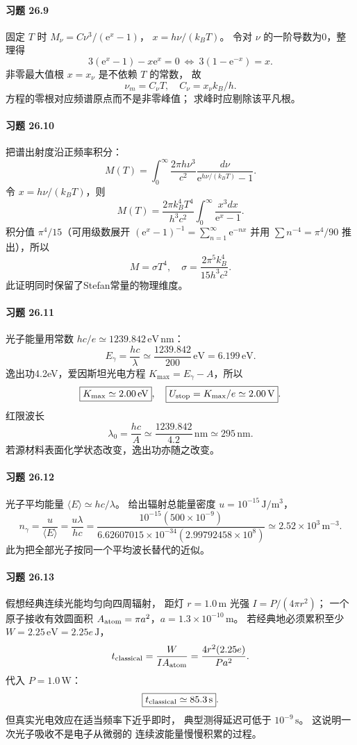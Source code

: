 \paragraph{习题 26.9}
固定 \(T\) 时
\(M_\nu=C\nu^3/(\mathrm e^x-1)\)，
\(x=h\nu/(k_BT)\)。
令对 \(\nu\) 的一阶导数为0，整理得
\[
3(\mathrm e^x-1)-x\mathrm e^x=0
\ \Longleftrightarrow\
\boxed{3(1-\mathrm e^{-x})=x}.
\]
非零最大值根 \(x=x_\nu\) 是不依赖 \(T\) 的常数，
故
\[
\boxed{\nu_m=C_\nu T,\quad
C_\nu=x_\nu k_B/h}.
\]
方程的零根对应频谱原点而不是非零峰值；
求峰时应剔除该平凡根。

\paragraph{习题 26.10}
把谱出射度沿正频率积分：
\[
M(T)=\int_0^\infty
\frac{2\pi h\nu^3}{c^2}
\frac{d\nu}{\mathrm e^{h\nu/(k_BT)}-1}.
\]
令 \(x=h\nu/(k_BT)\)，则
\[
M(T)=\frac{2\pi k_B^4T^4}{h^3c^2}
\int_0^\infty\frac{x^3dx}{\mathrm e^x-1}.
\]
积分值 \(\pi^4/15\)（可用级数展开
\((\mathrm e^x-1)^{-1}=\sum_{n=1}^\infty\mathrm e^{-nx}\)
并用 \(\sum n^{-4}=\pi^4/90\) 推出），所以
\[
\boxed{M=\sigma T^4,\quad
\sigma=\frac{2\pi^5k_B^4}{15h^3c^2}}.
\]
此证明同时保留了Stefan常量的物理维度。

\paragraph{习题 26.11}
光子能量用常数
\(hc/e\simeq1239.842\,\mathrm{eV\,nm}\)：
\[
E_\gamma=\frac{hc}{\lambda}
\simeq\frac{1239.842}{200}\,\mathrm{eV}
=6.199\,\mathrm{eV}.
\]
逸出功4.2eV，爱因斯坦光电方程
\(K_{\max}=E_\gamma-A\)，所以
\[
\boxed{K_{\max}\simeq2.00\,\mathrm{eV}},\quad
\boxed{U_{\rm stop}=K_{\max}/e\simeq2.00\,\mathrm V}.
\]
红限波长
\[
\boxed{\lambda_0=\frac{hc}{A}
\simeq\frac{1239.842}{4.2}\,\mathrm{nm}
\simeq295\,\mathrm{nm}}.
\]
若源材料表面化学状态改变，逸出功亦随之改变。

\paragraph{习题 26.12}
光子平均能量
\(\langle E\rangle\simeq hc/\lambda\)。
给出辐射总能量密度
\(u=10^{-15}\,\mathrm{J/m^3}\)，
\[
\boxed{n_\gamma=\frac{u}{\langle E\rangle}
=\frac{u\lambda}{hc}
=\frac{10^{-15}(500\times10^{-9})}
{6.62607015\times10^{-34}(2.99792458\times10^8)}
\simeq2.52\times10^3\,\mathrm{m^{-3}}}.
\]
此为把全部光子按同一个平均波长替代的近似。

\paragraph{习题 26.13}
假想经典连续光能均匀向四周辐射，
距灯 \(r=1.0\,\mathrm m\) 光强
\(I=P/(4\pi r^2)\)；
一个原子接收有效圆面积
\(A_{\rm atom}=\pi a^2\)，\(a=1.3\times10^{-10}\,\mathrm m\)。
若经典地必须累积至少
\(W=2.25\,\mathrm{eV}=2.25e\,\mathrm J\)，
\[
t_{\rm classical}=\frac{W}{IA_{\rm atom}}
=\frac{4r^2(2.25e)}{Pa^2}.
\]
代入 \(P=1.0\,\mathrm W\)：
\[
\boxed{t_{\rm classical}\simeq85.3\,\mathrm s}.
\]
但真实光电效应在适当频率下近乎即时，
典型测得延迟可低于 \(10^{-9}\,\mathrm s\)。
这说明一次光子吸收不是电子从微弱的
连续波能量慢慢积累的过程。

